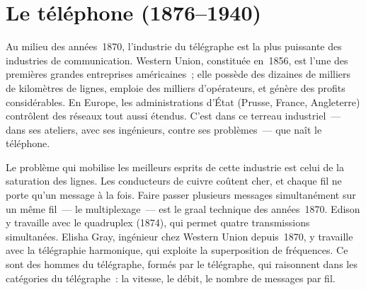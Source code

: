 \section{Le téléphone (1876--1940)}\label{sec:telephone}



Au milieu des années~1870, l'industrie du télégraphe est la plus puissante des industries de communication. Western Union, constituée en~1856, est l'une des premières grandes entreprises américaines~; elle possède des dizaines de milliers de kilomètres de lignes, emploie des milliers d'opérateurs, et génère des profits considérables. En Europe, les administrations d'État (Prusse, France, Angleterre) contrôlent des réseaux tout aussi étendus. C'est dans ce terreau industriel~--- dans ses ateliers, avec ses ingénieurs, contre ses problèmes~--- que naît le téléphone.

Le problème qui mobilise les meilleurs esprits de cette industrie est celui de la saturation des lignes. Les conducteurs de cuivre coûtent cher, et chaque fil ne porte qu'un message à la fois. Faire passer plusieurs messages simultanément sur un même fil~--- le multiplexage~--- est le graal technique des années~1870. Edison y travaille avec le quadruplex (1874), qui permet quatre transmissions simultanées. Elisha Gray, ingénieur chez Western Union depuis~1870, y travaille avec la télégraphie harmonique, qui exploite la superposition de fréquences. Ce sont des hommes du télégraphe, formés par le télégraphe, qui raisonnent dans les catégories du télégraphe~: la vitesse, le débit, le nombre de messages par fil.

